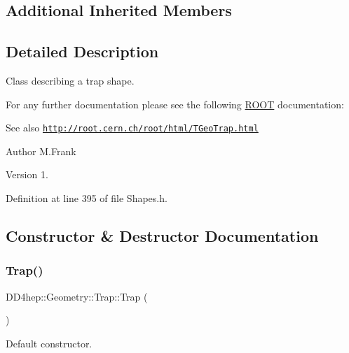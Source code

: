 \subsection*{Additional Inherited Members}


\subsection{Detailed Description}
Class describing a trap shape. 

For any further documentation please see the following \hyperlink{namespace_r_o_o_t}{R\+O\+OT} documentation\+: \begin{DoxySeeAlso}{See also}
\href{http://root.cern.ch/root/html/TGeoTrap.html}{\tt http\+://root.\+cern.\+ch/root/html/\+T\+Geo\+Trap.\+html}
\end{DoxySeeAlso}
\begin{DoxyAuthor}{Author}
M.\+Frank 
\end{DoxyAuthor}
\begin{DoxyVersion}{Version}
1. 
\end{DoxyVersion}


Definition at line 395 of file Shapes.\+h.



\subsection{Constructor \& Destructor Documentation}
\hypertarget{class_d_d4hep_1_1_geometry_1_1_trap_ad1814caeb6dfd754886b4498d78fcdcd}{}\label{class_d_d4hep_1_1_geometry_1_1_trap_ad1814caeb6dfd754886b4498d78fcdcd} 
\subsubsection{\texorpdfstring{Trap()}{Trap()}\hspace{0.1cm}{\footnotesize\ttfamily [1/7]}}
{\footnotesize\ttfamily D\+D4hep\+::\+Geometry\+::\+Trap\+::\+Trap (\begin{DoxyParamCaption}{ }\end{DoxyParamCaption})\hspace{0.3cm}{\ttfamily [default]}}



Default constructor. 

\hypertarget{class_d_d4hep_1_1_geometry_1_1_trap_a221771330b8027cffaebc559ae7ae230}{}\label{class_d_d4hep_1_1_geometry_1_1_trap_a221771330b8027cffaebc559ae7ae230} 

